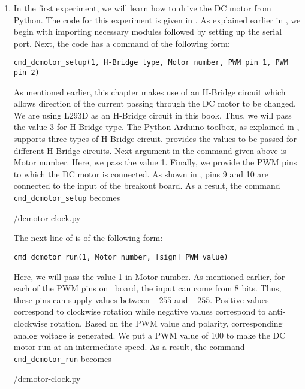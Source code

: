\begin{enumerate}
  \item In the first experiment, we will learn how to drive the DC motor
        from Python. The code for this experiment is 
        given in  . As explained earlier in , we begin with 
        importing necessary modules followed by setting up the serial port. 
        Next, the code has a command of the following form: 
        \begin{lstlisting}[style=nonumbers]
              cmd_dcmotor_setup(1, H-Bridge type, Motor number, PWM pin 1, PWM pin 2)
        \end{lstlisting}
        As mentioned earlier, this chapter makes use of an H-Bridge circuit which 
        allows direction of the current passing through the DC motor to be changed.
        We are using L293D as an H-Bridge circuit in this book. Thus, we will pass the value 3 for
        H-Bridge type. The Python-Arduino toolbox, as explained in , 
        supports three types of H-Bridge circuit. 
        provides the values to be passed for different H-Bridge circuits. 
        Next argument in the command given above is Motor number. Here, we pass the value 1. 
        Finally, we provide the PWM pins to which the DC motor is connected. As 
        shown in , pins 9 and 10 are connected to the
        input of the breakout board. As a result, the command {\tt cmd\_dcmotor\_setup} becomes
        
        {\LocDCMpycode/dcmotor-clock.py}
        
        The next line of  is of the following form: 
        \begin{lstlisting}[style=nonumbers]
          cmd_dcmotor_run(1, Motor number, [sign] PWM value)
        \end{lstlisting}
        Here, we will pass the value 1 in Motor number.  As mentioned earlier, 
        for each of the PWM pins on \arduino\ board, the input can come from 8 bits.
        Thus, these pins can supply values between $- 255$ and $+ 255$. Positive values correspond to clockwise
        rotation while negative values correspond to anti-clockwise rotation. Based on the PWM value and polarity, 
        corresponding analog voltage is generated.  
        We put a PWM value of 100 to make the DC motor run at an intermediate speed.  
        As a result, the command {\tt cmd\_dcmotor\_run} becomes
        
        {\LocDCMpycode/dcmotor-clock.py}
        

\end{enumerate}
